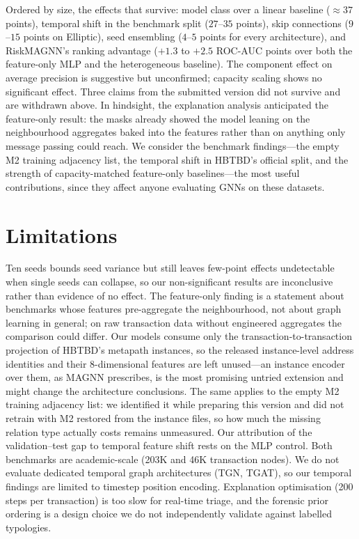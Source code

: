 \documentclass[conference]{IEEEtran}
\begin{document}
Ordered by size, the effects that survive: model class over a linear
baseline ($\approx 37$ points), temporal shift in the benchmark split
($27$--$35$ points), skip connections ($9$--$15$ points on Elliptic), seed
ensembling ($4$--$5$ points for every architecture), and RiskMAGNN's ranking
advantage ($+1.3$ to $+2.5$ ROC-AUC points over both the feature-only MLP
and the heterogeneous baseline). The component effect on average precision is
suggestive but unconfirmed; capacity scaling shows no significant effect.
Three claims from the submitted version did not survive and are withdrawn
above. In hindsight, the explanation analysis anticipated the feature-only
result: the masks already showed the model leaning on the neighbourhood
aggregates baked into the features rather than on anything only message
passing could reach. We consider the benchmark findings---the empty M2
training adjacency list, the temporal shift in HBTBD's official split, and
the strength of capacity-matched feature-only baselines---the most useful
contributions, since they affect anyone evaluating GNNs on these datasets.

\section{Limitations}

Ten seeds bounds seed variance but still leaves few-point effects
undetectable when single seeds can collapse, so our non-significant results
are inconclusive rather than evidence of no effect. The feature-only finding
is a statement about benchmarks whose features pre-aggregate the
neighbourhood, not about graph learning in general; on raw transaction data
without engineered aggregates the comparison could differ. Our models consume
only the transaction-to-transaction projection of HBTBD's metapath instances,
so the released instance-level address identities and their 8-dimensional
features are left unused---an instance encoder over them, as MAGNN
prescribes, is the most promising untried extension and might change the
architecture conclusions. The same applies to the empty M2 training
adjacency list: we identified it while preparing this version and did not
retrain with M2 restored from the instance files, so how much the missing
relation type actually costs remains unmeasured. Our attribution of the
validation--test gap to temporal feature shift rests on the MLP control. Both benchmarks are academic-scale (203K and
46K transaction nodes). We do not evaluate dedicated temporal graph
architectures (TGN, TGAT), so our temporal findings are limited to timestep
position encoding. Explanation optimisation (200 steps per transaction) is
too slow for real-time triage, and the forensic prior ordering is a design
choice we do not independently validate against labelled typologies.
\end{document}
